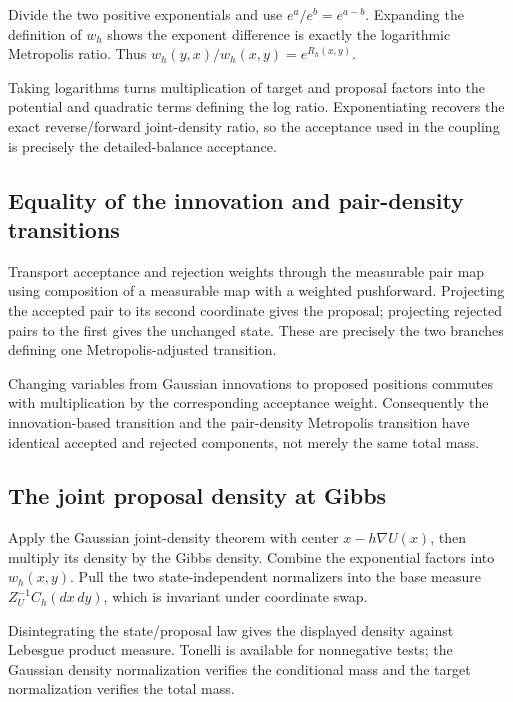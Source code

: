 \documentclass[11pt,a4paper]{report}
\begin{document}
Divide the two positive exponentials and use \(e^a/e^b=e^{a-b}\). Expanding the definition of \(w_h\) shows the exponent difference is exactly the logarithmic Metropolis ratio. Thus \(w_h(y,x)/w_h(x,y)=e^{R_h(x,y)}\).



Taking logarithms turns multiplication of target and proposal factors into the potential and quadratic terms defining the log ratio. Exponentiating recovers the exact reverse/\allowbreak{}forward joint-density ratio, so the acceptance used in the coupling is precisely the detailed-balance acceptance.

\subsection{\texorpdfstring{Equality of the innovation and pair-density transitions}{Equality of the innovation and pair-density transitions}}
\label{report-step-UnadjustedLangevin-MALAInvariance-lean-4}


Transport acceptance and rejection weights through the measurable pair map using composition of a measurable map with a weighted pushforward. Projecting the accepted pair to its second coordinate gives the proposal; projecting rejected pairs to the first gives the unchanged state. These are precisely the two branches defining one Metropolis-adjusted transition.



Changing variables from Gaussian innovations to proposed positions commutes with multiplication by the corresponding acceptance weight. Consequently the innovation-based transition and the pair-density Metropolis transition have identical accepted and rejected components, not merely the same total mass.

\subsection{\texorpdfstring{The joint proposal density at Gibbs}{The joint proposal density at Gibbs}}
\label{report-step-UnadjustedLangevin-MALAInvariance-lean-5}


Apply the Gaussian joint-density theorem with center \(x-h\nabla U(x)\), then multiply its density by the Gibbs density. Combine the exponential factors into \(w_h(x,y)\). Pull the two state-independent normalizers into the base measure \(Z_U^{-1}C_h(dx\,dy)\), which is invariant under coordinate swap.



Disintegrating the state/\allowbreak{}proposal law gives the displayed density against Lebesgue product measure. Tonelli is available for nonnegative tests; the Gaussian density normalization verifies the conditional mass and the target normalization verifies the total mass.
\end{document}
